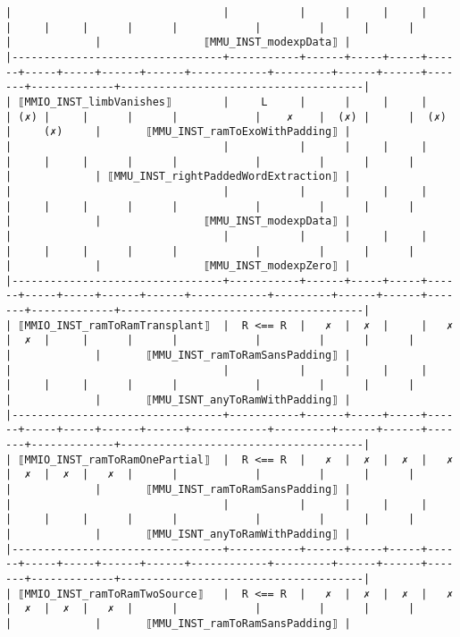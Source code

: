 \documentclass[varwidth=\maxdimen,margin=0.5cm,multi={verbatim}]{standalone}
\begin{document}
\begin{verbatim}
|                                 |           |      |     |     |      |     |     |      |      |            |         |      |      |       |             |                ⟦MMU_INST_modexpData⟧ |
|---------------------------------+-----------+------+-----+-----+------+-----+-----+------+------+------------+---------+------+------+-------+-------------+--------------------------------------|
| ⟦MMIO_INST_limbVanishes⟧        |     L     |      |     |     |      | (✗) |     |      |      |            |    ✗    |  (✗) |      |  (✗)  |     (✗)     |       ⟦MMU_INST_ramToExoWithPadding⟧ |
|                                 |           |      |     |     |      |     |     |      |      |            |         |      |      |       |             | ⟦MMU_INST_rightPaddedWordExtraction⟧ |
|                                 |           |      |     |     |      |     |     |      |      |            |         |      |      |       |             |                ⟦MMU_INST_modexpData⟧ |
|                                 |           |      |     |     |      |     |     |      |      |            |         |      |      |       |             |                ⟦MMU_INST_modexpZero⟧ |
|---------------------------------+-----------+------+-----+-----+------+-----+-----+------+------+------------+---------+------+------+-------+-------------+--------------------------------------|
| ⟦MMIO_INST_ramToRamTransplant⟧  |  R <== R  |   ✗  |  ✗  |     |   ✗  |  ✗  |     |      |      |            |         |      |      |       |             |       ⟦MMU_INST_ramToRamSansPadding⟧ |
|                                 |           |      |     |     |      |     |     |      |      |            |         |      |      |       |             |       ⟦MMU_ISNT_anyToRamWithPadding⟧ |
|---------------------------------+-----------+------+-----+-----+------+-----+-----+------+------+------------+---------+------+------+-------+-------------+--------------------------------------|
| ⟦MMIO_INST_ramToRamOnePartial⟧  |  R <== R  |   ✗  |  ✗  |  ✗  |   ✗  |  ✗  |  ✗  |   ✗  |      |            |         |      |      |       |             |       ⟦MMU_INST_ramToRamSansPadding⟧ |
|                                 |           |      |     |     |      |     |     |      |      |            |         |      |      |       |             |       ⟦MMU_ISNT_anyToRamWithPadding⟧ |
|---------------------------------+-----------+------+-----+-----+------+-----+-----+------+------+------------+---------+------+------+-------+-------------+--------------------------------------|
| ⟦MMIO_INST_ramToRamTwoSource⟧   |  R <== R  |   ✗  |  ✗  |  ✗  |   ✗  |  ✗  |  ✗  |   ✗  |      |            |         |      |      |       |             |       ⟦MMU_INST_ramToRamSansPadding⟧ |

\end{verbatim}
\end{document}
